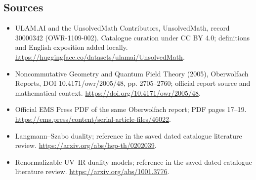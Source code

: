 \documentclass[11pt]{article}
\begin{document}
\subsection{Sources}
\begin{itemize}
\item[\hypertarget{source:30000342:1}{S1}] ULAM.AI and the UnsolvedMath Contributors, UnsolvedMath, record 30000342 (OWR-1109-002). Catalogue curation under CC BY 4.0; definitions and English exposition added locally.
\url{https://huggingface.co/datasets/ulamai/UnsolvedMath}.
\item[\hypertarget{source:30000342:2}{S2}] Noncommutative Geometry and Quantum Field Theory (2005), Oberwolfach Reports, DOI 10.4171/owr/2005/48, pp. 2705--2760; official report source and mathematical context.
\url{https://doi.org/10.4171/owr/2005/48}.
\item[\hypertarget{source:30000342:3}{S3}] Official EMS Press PDF of the same Oberwolfach report; PDF pages 17--19.
\url{https://ems.press/content/serial-article-files/46022}.
\item[\hypertarget{source:30000342:4}{S4}] Langmann--Szabo duality; reference in the saved dated catalogue literature review.
\url{https://arxiv.org/abs/hep-th/0202039}.
\item[\hypertarget{source:30000342:5}{S5}] Renormalizable UV--IR duality models; reference in the saved dated catalogue literature review.
\url{https://arxiv.org/abs/1001.3776}.
\end{itemize}
\label{end:30000342}
\end{document}
